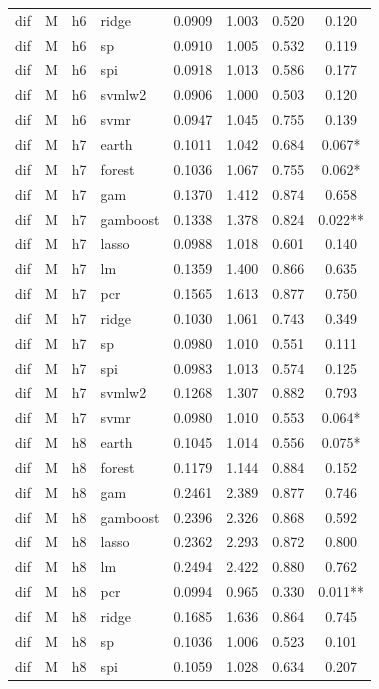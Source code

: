 \begin{ThreePartTable}
\begin{longtable}[t]{llclcccc}
dif & M & h6 & ridge & 0.0909 & 1.003 & 0.520 & 0.120\\
dif & M & h6 & sp & 0.0910 & 1.005 & 0.532 & 0.119\\
dif & M & h6 & spi & 0.0918 & 1.013 & 0.586 & 0.177\\
dif & M & h6 & svmlw2 & 0.0906 & 1.000 & 0.503 & 0.120\\
dif & M & h6 & svmr & 0.0947 & 1.045 & 0.755 & 0.139\\
\addlinespace
dif & M & h7 & earth & 0.1011 & 1.042 & 0.684 & 0.067*\\
dif & M & h7 & forest & 0.1036 & 1.067 & 0.755 & 0.062*\\
dif & M & h7 & gam & 0.1370 & 1.412 & 0.874 & 0.658\\
dif & M & h7 & gamboost & 0.1338 & 1.378 & 0.824 & 0.022**\\
dif & M & h7 & lasso & 0.0988 & 1.018 & 0.601 & 0.140\\
dif & M & h7 & lm & 0.1359 & 1.400 & 0.866 & 0.635\\
dif & M & h7 & pcr & 0.1565 & 1.613 & 0.877 & 0.750\\
dif & M & h7 & ridge & 0.1030 & 1.061 & 0.743 & 0.349\\
dif & M & h7 & sp & 0.0980 & 1.010 & 0.551 & 0.111\\
dif & M & h7 & spi & 0.0983 & 1.013 & 0.574 & 0.125\\
dif & M & h7 & svmlw2 & 0.1268 & 1.307 & 0.882 & 0.793\\
dif & M & h7 & svmr & 0.0980 & 1.010 & 0.553 & 0.064*\\
\addlinespace
dif & M & h8 & earth & 0.1045 & 1.014 & 0.556 & 0.075*\\
dif & M & h8 & forest & 0.1179 & 1.144 & 0.884 & 0.152\\
dif & M & h8 & gam & 0.2461 & 2.389 & 0.877 & 0.746\\
dif & M & h8 & gamboost & 0.2396 & 2.326 & 0.868 & 0.592\\
dif & M & h8 & lasso & 0.2362 & 2.293 & 0.872 & 0.800\\
dif & M & h8 & lm & 0.2494 & 2.422 & 0.880 & 0.762\\
dif & M & h8 & pcr & 0.0994 & 0.965 & 0.330 & 0.011**\\
dif & M & h8 & ridge & 0.1685 & 1.636 & 0.864 & 0.745\\
dif & M & h8 & sp & 0.1036 & 1.006 & 0.523 & 0.101\\
dif & M & h8 & spi & 0.1059 & 1.028 & 0.634 & 0.207\\

\end{longtable}
\end{ThreePartTable}

